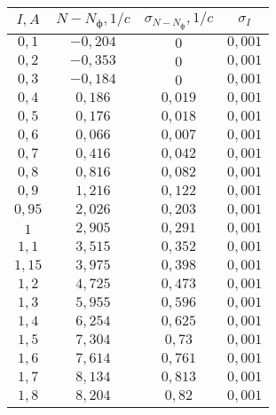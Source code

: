 \begin{tabular}{| c | c | c | c |}
\hline
$I, A$ & $N - N_ф, 1/c$ & $\sigma_{N - N_ф}, 1/c$ & $\sigma_{I}$\\
    \hline
    $0,1$ & $-0,204$ & $0$ & $0,001$\\
    \hline
    $0,2$ & $-0,353$ & $0$ & $0,001$\\
    \hline
    $0,3$ & $-0,184$ & $0$ & $0,001$\\
    \hline
    $0,4$ & $0,186$ & $0,019$ & $0,001$\\
    \hline
    $0,5$ & $0,176$ & $0,018$ & $0,001$\\
    \hline
    $0,6$ & $0,066$ & $0,007$ & $0,001$\\
    \hline
    $0,7$ & $0,416$ & $0,042$ & $0,001$\\
    \hline
    $0,8$ & $0,816$ & $0,082$ & $0,001$\\
    \hline
    $0,9$ & $1,216$ & $0,122$ & $0,001$\\
    \hline
    $0,95$ & $2,026$ & $0,203$ & $0,001$\\
    \hline
    $1$ & $2,905$ & $0,291$ & $0,001$\\
    \hline
    $1,1$ & $3,515$ & $0,352$ & $0,001$\\
    \hline
    $1,15$ & $3,975$ & $0,398$ & $0,001$\\
    \hline
    $1,2$ & $4,725$ & $0,473$ & $0,001$\\
    \hline
    $1,3$ & $5,955$ & $0,596$ & $0,001$\\
    \hline
    $1,4$ & $6,254$ & $0,625$ & $0,001$\\
    \hline
    $1,5$ & $7,304$ & $0,73$ & $0,001$\\
    \hline
    $1,6$ & $7,614$ & $0,761$ & $0,001$\\
    \hline
    $1,7$ & $8,134$ & $0,813$ & $0,001$\\
    \hline
    $1,8$ & $8,204$ & $0,82$ & $0,001$\\
\hline
\end{tabular}
